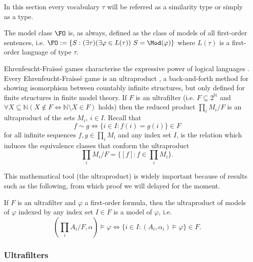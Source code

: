 In this section every vocabulary $\tau$ will be referred as a similarity type or simply as a type.

The model class $\FO$ is, as always, defined as the class of models of all first-order sentences, i.e. $\FO:= \{S:(\exists\tau)(\exists\varphi\in L(\tau))\ S=\Mod(\varphi)\}$ where $L(\tau)$ is a first-order language of type $\tau$.

Ehrenfeucht-Fra\"iss\'e games characterise the expressive power of logical languages \cite{ams}. Every Ehrenfeucht-Fra\"iss\'e game is an ultraproduct \cite{models}, a back-and-forth method for showing isomorphism between countably infinite structures, but only defined for finite structures in finite model theory. If $F$ is an ultrafilter (i.e. $F\subseteq 2^{\mathbb{N}}$ and $\forall X\subseteq\mathbb{N} (X\notin F \Leftrightarrow \mathbb{N}\setminus X\in F)$ holds) then the reduced product $\prod_{i}M_i / F$ is an ultraproduct of the sets $M_i$, $i\in I$. Recall that \[f\sim g \Leftrightarrow \{i\in I : f(i) = g(i)\}\in F\] for all infinite sequences $f,g\in\prod_i M_i$ and any index set $I$, is the relation which induces the equivalence classes that conform the ultraproduct \[\prod_{i}M_i / F = \{[f]:f\in\prod_i M_i\}.\] 

This mathematical tool (the ultraproduct) is widely important because of results such as the following, from which proof we will delayed for the moment.

\begin{lem}[$\L$o\'s Lemma]
If $F$ is an ultrafilter and $\varphi$ a first-order formula, then the ultraproduct of models of $\varphi$ indexed by any index set $I\in F$ is a model of $\varphi$, i.e. \[(\prod_i A_i / F , \alpha)\models\varphi\Leftrightarrow\{i\in I: (A_i, \alpha_i)\models\varphi\}\in F.\]
\end{lem}

\subsubsection{Ultrafilters}


